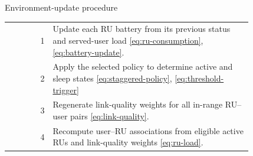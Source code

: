 \begin{algorithm}{Environment-update procedure}
\label{alg:environment-update}
\begin{tabular}{@{}r@{\quad}p{0.82\linewidth}@{}}
1 & Update each RU battery from its previous status and served-user load  \eqref{eq:ru-consumption}, \eqref{eq:battery-update}. \\
2 & Apply the selected policy to determine active and sleep states \eqref{eq:staggered-policy}, \eqref{eq:threshold-trigger} \\
3 & Regenerate link-quality weights for all in-range RU--user pairs \eqref{eq:link-quality}. \\
4 & Recompute user--RU associations from eligible active RUs and link-quality weights \eqref{eq:ru-load}. \\
\end{tabular}
\end{algorithm}
